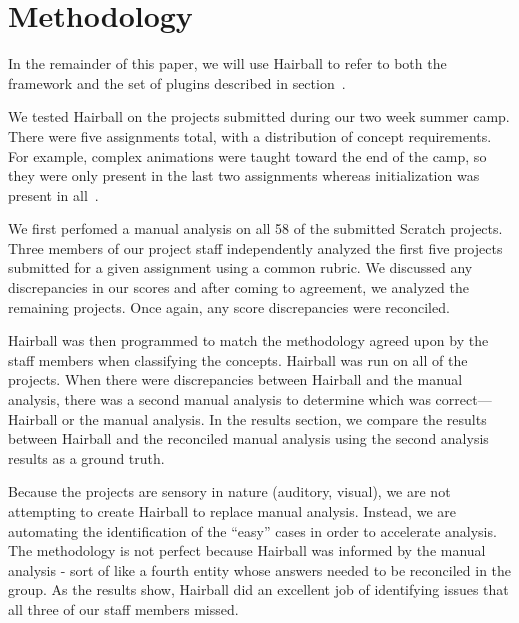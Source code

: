 \section{Methodology} 
In the remainder of this paper, we will use Hairball to refer to both the
framework and the set of plugins described in section~.

We tested Hairball on the projects submitted during our two week summer camp.
There were five assignments total, with a distribution of concept
requirements. For example, complex animations were taught toward the end of the
camp, so they were only present in the last two assignments whereas
initialization was present in all~\cite{Franklin:2013:SBO}.

We first perfomed a manual analysis on all 58 of the submitted Scratch
projects.  Three members of our project staff independently analyzed the first
five projects submitted for a given assignment using a common rubric. We
discussed any discrepancies in our scores and after coming to agreement, we
analyzed the remaining projects.  Once again, any score discrepancies were
reconciled.

Hairball was then programmed to match the methodology agreed upon by the staff
members when classifying the concepts.  Hairball was run on all of the
projects.  When there were discrepancies between Hairball and the manual
analysis, there was a second manual analysis to determine which was
correct---Hairball or the manual analysis.  In the results section, we compare
the results between Hairball and the reconciled manual analysis using the
second analysis results as a ground truth.

Because the projects are sensory in nature (auditory, visual), we are not
attempting to create Hairball to replace manual analysis.  Instead, we are
automating the identification of the ``easy'' cases in order to accelerate
analysis.  The methodology is not perfect because Hairball was informed by the
manual analysis - sort of like a fourth entity whose answers needed to be
reconciled in the group.  As the results show, Hairball did an excellent job of
identifying issues that all three of our staff members missed.
